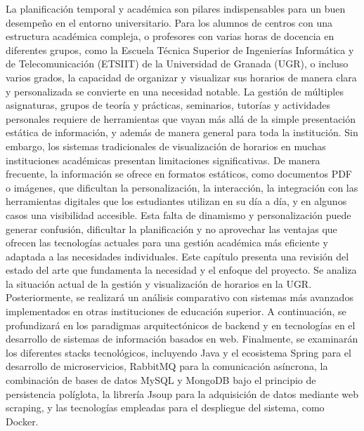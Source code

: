 La planificación temporal y académica son pilares indispensables para un buen desempeño en el entorno universitario. Para los alumnos de centros con una estructura académica compleja, o profesores con varias horas de docencia en diferentes grupos, como la Escuela Técnica Superior de Ingenierías Informática y de Telecomunicación (ETSIIT) de la Universidad de Granada (UGR), o incluso varios grados, la capacidad de organizar y visualizar sus horarios de manera clara y personalizada se convierte en una necesidad notable.
\newline\newline
La gestión de múltiples asignaturas, grupos de teoría y prácticas, seminarios, tutorías y actividades personales requiere de herramientas que vayan más allá de la simple presentación estática de información, y además de manera general para toda la institución.
\newline\newline
Sin embargo, los sistemas tradicionales de visualización de horarios en muchas instituciones académicas presentan limitaciones significativas. De manera frecuente, la información se ofrece en formatos estáticos, como documentos PDF o imágenes, que dificultan la personalización, la interacción, la integración con las herramientas digitales que los estudiantes utilizan en su día a día, y en algunos casos una visibilidad accesible.
\newline\newline
Esta falta de dinamismo y personalización puede generar confusión, dificultar la planificación y no aprovechar las ventajas que ofrecen las tecnologías actuales para una gestión académica más eficiente y adaptada a las necesidades individuales.
\newline\newline
Este capítulo presenta una revisión del estado del arte que fundamenta la necesidad y el enfoque del proyecto. Se analiza la situación actual de la gestión y visualización de horarios en la UGR. 
Posteriormente, se realizará un análisis comparativo con sistemas más avanzados implementados en otras instituciones de educación superior. A continuación, se profundizará en los paradigmas arquitectónicos de backend y en tecnologías en el desarrollo de sistemas de información basados en web. Finalmente, se examinarán los diferentes stacks tecnológicos, incluyendo Java y el ecosistema Spring para el desarrollo de microservicios, RabbitMQ para la comunicación asíncrona, la combinación de bases de datos MySQL y MongoDB bajo el principio de persistencia políglota, la librería Jsoup para la adquisición de datos mediante web scraping, y las tecnologías empleadas para el despliegue del sistema, como Docker.

